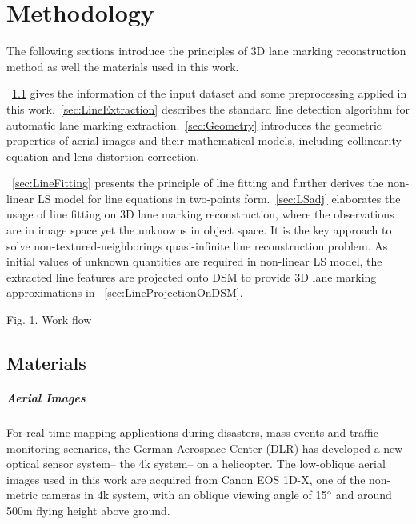 
\chapter{Methodology}
\label{chap:k2}

The following sections introduce the principles of 3D lane marking reconstruction method as well the materials used in this work.%

~\cref{sec:Materials} gives the information of the input dataset and some preprocessing applied in this work.~\cref{sec:LineExtraction} describes the standard line detection algorithm for automatic lane marking extraction.~\cref{sec:Geometry} introduces the geometric properties of aerial images and their mathematical models, including collinearity equation and lens distortion correction.

~\cref{sec:LineFitting} presents the principle of line fitting and further derives the non-linear LS model for line equations in two-points form.~\cref{sec:LSadj} elaborates the usage of line fitting on 3D lane marking reconstruction, where the observations are in image space yet the unknowns in object space. It is the key approach to solve non-textured-neighborings quasi-infinite line reconstruction problem. As initial values of unknown quantities are required in non-linear LS model, the extracted line features are projected onto DSM to provide 3D lane marking approximations in ~\cref{sec:LineProjectionOnDSM}.

Fig. 1. Work flow

\clearpage

\section{Materials}
\label{sec:Materials}


\paragraph{Aerial Images}

For real-time mapping applications during disasters, mass events and traffic monitoring scenarios, the German Aerospace Center (DLR) has developed a new optical sensor system-- the 4k system-- on a helicopter. %
The low-oblique aerial images used in this work are acquired from Canon EOS 1D-X, one of the non-metric cameras in 4k system, with an oblique viewing angle of 15$\degree$ and around 500m flying height above ground.

